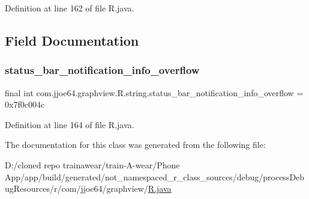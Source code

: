 Definition at line 162 of file R.\+java.


\begin{DoxyCode}{0}

\end{DoxyCode}


\subsection{Field Documentation}
\mbox{\label{classcom_1_1jjoe64_1_1graphview_1_1_r_1_1string_a7d583396aeb69569c8304e0e68da8c43}} 
\subsubsection{\texorpdfstring{status\_bar\_notification\_info\_overflow}{status\_bar\_notification\_info\_overflow}}
{\footnotesize\ttfamily final int com.\+jjoe64.\+graphview.\+R.\+string.\+status\+\_\+bar\+\_\+notification\+\_\+info\+\_\+overflow = 0x7f0c004c\hspace{0.3cm}{\ttfamily [static]}}



Definition at line 164 of file R.\+java.



The documentation for this class was generated from the following file\+:\begin{DoxyCompactItemize}
\item 
D\+:/cloned repo trainawear/train-\/\+A-\/wear/\+Phone App/app/build/generated/not\+\_\+namespaced\+\_\+r\+\_\+class\+\_\+sources/debug/process\+Debug\+Resources/r/com/jjoe64/graphview/\mbox{\hyperlink{process_debug_resources_2r_2com_2jjoe64_2graphview_2_r_8java}{R.\+java}}\end{DoxyCompactItemize}
